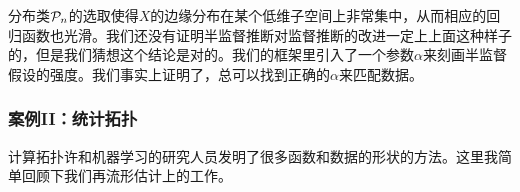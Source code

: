 \documentclass[]{article}
\begin{document}
分布类${\mathcal{P}}_n$的选取使得$X$的边缘分布在某个低维子空间上非常集中，从而相应的回归函数也光滑。我们还没有证明半监督推断对监督推断的改进一定上上面这种样子的，但是我们猜想这个结论是对的。我们的框架里引入了一个参数$\alpha$来刻画半监督假设的强度。我们事实上证明了，总可以找到正确的$\alpha$来匹配数据。

\subsubsection{案例II：统计拓扑}
计算拓扑许和机器学习的研究人员发明了很多函数和数据的形状的方法。这里我简单回顾下我们再流形估计上的工作\cite{wass2012a,wass2012b,wass2012c}。




\end{document}
